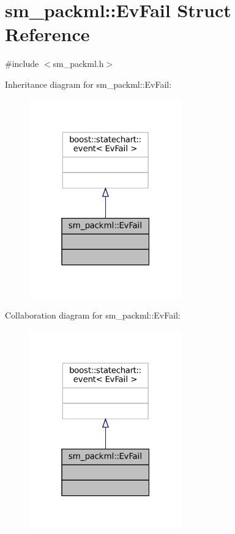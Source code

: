 \hypertarget{structsm__packml_1_1EvFail}{}\section{sm\+\_\+packml\+:\+:Ev\+Fail Struct Reference}
\label{structsm__packml_1_1EvFail}


{\ttfamily \#include $<$sm\+\_\+packml.\+h$>$}



Inheritance diagram for sm\+\_\+packml\+:\+:Ev\+Fail\+:
\nopagebreak
\begin{figure}[H]
\begin{center}
\leavevmode
\includegraphics[width=187pt]{structsm__packml_1_1EvFail__inherit__graph}
\end{center}
\end{figure}


Collaboration diagram for sm\+\_\+packml\+:\+:Ev\+Fail\+:
\nopagebreak
\begin{figure}[H]
\begin{center}
\leavevmode
\includegraphics[width=187pt]{structsm__packml_1_1EvFail__coll__graph}
\end{center}
\end{figure}


